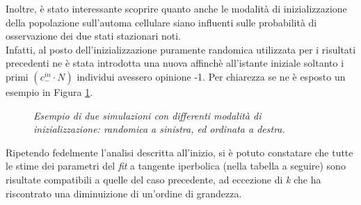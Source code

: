 \documentclass[letterpaper,10pt]{article}
\begin{document}
Inoltre, è stato interessante scoprire quanto anche le modalità di inizializzazione della popolazione sull'automa cellulare siano influenti sulle probabilità di osservazione dei due stati stazionari noti.
\\ Infatti, al posto dell'inizializzazione puramente randomica utilizzata per i risultati precedenti ne è stata introdotta una nuova affinchè all'istante iniziale soltanto i primi $(c_{-}^{in} \cdot N)$ individui avessero opinione -1. Per chiarezza se ne è esposto un esempio in Figura \ref{Fig:12}.

\begin{figure}[h]
{\centering\par
{}
\par}
\caption{\textit{Esempio di due simulazioni con differenti modalità di inizializzazione: randomica a sinistra, ed ordinata a destra. }}
\label{Fig:12}
\end{figure}
\medskip

Ripetendo fedelmente l'analisi descritta all'inizio, si è potuto constatare che tutte le stime dei parametri del \textit{fit} a tangente iperbolica (nella tabella a seguire) sono risultate compatibili a quelle del caso precedente, ad eccezione di \textit{k} che ha riscontrato una diminuizione di un'ordine di grandezza.
\end{document}
